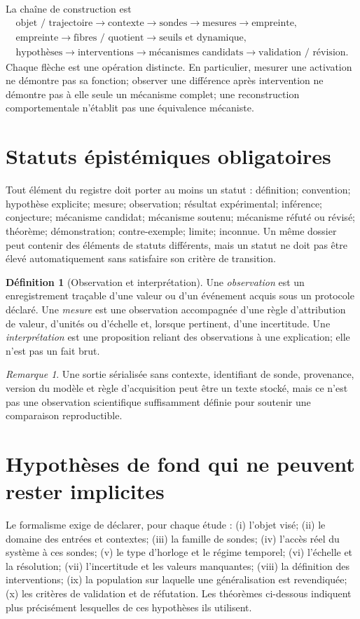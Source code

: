 \documentclass[11pt,oneside]{book}
\theoremstyle{definition}
\newtheorem{definition}[theoreme]{Définition}
\theoremstyle{remark}
\newtheorem{remarque}[theoreme]{Remarque}
\newcommand{\1}{\mathbf 1}
\begin{document}
La chaîne de construction est
\[\begin{gathered}
\text{objet / trajectoire}\to\text{contexte}\to\text{sondes}\to\text{mesures}\to\text{empreinte},\\
\text{empreinte}\to\text{fibres / quotient}\to\text{seuils et dynamique},\\
\text{hypothèses}\to\text{interventions}\to\text{mécanismes candidats}\to\text{validation / révision}.
\end{gathered}\]
Chaque flèche est une opération distincte. En particulier, mesurer une activation ne démontre pas sa fonction; observer une différence après intervention ne démontre pas à elle seule un mécanisme complet; une reconstruction comportementale n'établit pas une équivalence mécaniste.

\section{Statuts épistémiques obligatoires}
Tout élément du registre doit porter au moins un statut : définition; convention; hypothèse explicite; mesure; observation; résultat expérimental; inférence; conjecture; mécanisme candidat; mécanisme soutenu; mécanisme réfuté ou révisé; théorème; démonstration; contre-exemple; limite; inconnue. Un même dossier peut contenir des éléments de statuts différents, mais un statut ne doit pas être élevé automatiquement sans satisfaire son critère de transition.

\begin{definition}[Observation et interprétation]
Une \emph{observation} est un enregistrement traçable d'une valeur ou d'un événement acquis sous un protocole déclaré. Une \emph{mesure} est une observation accompagnée d'une règle d'attribution de valeur, d'unités ou d'échelle et, lorsque pertinent, d'une incertitude. Une \emph{interprétation} est une proposition reliant des observations à une explication; elle n'est pas un fait brut.
\end{definition}

\begin{remarque}
Une sortie sérialisée sans contexte, identifiant de sonde, provenance, version du modèle et règle d'acquisition peut être un texte stocké, mais ce n'est pas une observation scientifique suffisamment définie pour soutenir une comparaison reproductible.
\end{remarque}

\section{Hypothèses de fond qui ne peuvent rester implicites}
Le formalisme exige de déclarer, pour chaque étude : (i) l'objet visé; (ii) le domaine des entrées et contextes; (iii) la famille de sondes; (iv) l'accès réel du système à ces sondes; (v) le type d'horloge et le régime temporel; (vi) l'échelle et la résolution; (vii) l'incertitude et les valeurs manquantes; (viii) la définition des interventions; (ix) la population sur laquelle une généralisation est revendiquée; (x) les critères de validation et de réfutation. Les théorèmes ci-dessous indiquent plus précisément lesquelles de ces hypothèses ils utilisent.
\end{document}
